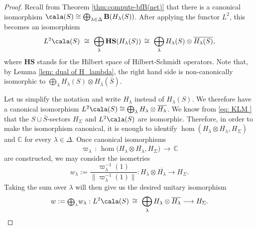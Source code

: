 \documentclass[a4paper,10pt,leqno]{amsart}
\newcommand{\IC}{\mathbb{C}}     \newcommand{\calc}{\mathcal{C}}
\newcommand{\bfB}{{\mathbf B}}   \newcommand{\sfB}{{\mathsf{B}}}
\theoremstyle{plain}
\theoremstyle{definition}
\theoremstyle{remark}
\begin{document}
\begin{proof}
Recall from Theorem \ref{thm:compute-bfB(net)} that there is a canonical isomorphism
$\cala(S) \cong \bigoplus_{\lambda\in\Delta} \bfB(H_\lambda(S))$.
After applying the functor $L^2$, this becomes an isomorphism
\[
L^2\cala(S) \,\,\cong\,\, \bigoplus_{\lambda} \mathbf{HS}(H_\lambda(S))\,\cong\,\,\bigoplus_{\lambda} H_\lambda(S)\otimes \overline{H_\lambda(S)},
\]
where $\mathbf{HS}$ stands for the Hilbert space of Hilbert-Schmidt operators.
Note that, by Lemma \ref{lem: dual of H_lambda}, the right hand side is non-canonically isomorphic to $\bigoplus_{\lambda} H_\lambda(S)\otimes {H_{\bar \lambda}(\bar S)}$.

Let us simplify the notation and write $H_\lambda$ instead of $H_\lambda(S)$.
We therefore have a canonical isomorphism $L^2\cala(S)\cong \bigoplus_{\lambda}H_\lambda\otimes \overline{H_\lambda}$.
We know from \eqref{eq:   KLM  } that the $S\sqcup \bar S$-sectors $H_\Sigma$ and $L^2\cala(S)$ are isomorphic.
Therefore, in order to make the isomorphism canonical, it is enough to identify
$\hom(H_\lambda\otimes \overline{H_\lambda},H_\Sigma)$ and $\IC$ for every $\lambda\in\Delta$.
Once canonical isomorphisms 
\begin{equation}\label{eq: varpi}
\varpi_\lambda\,:\,\hom\big(H_\lambda\otimes \overline{H_\lambda},H_\Sigma\big) \,\rightarrow\, \IC
\end{equation}
are constructed, we may consider the isometries
\[
w_\lambda:={\textstyle\frac{\varpi_\lambda^{-1}(1)}{\|\varpi_\lambda^{-1}(1)\|}}:H_\lambda\otimes \overline{H_\lambda}\to H_\Sigma.
\]
Taking the sum over $\lambda$ will then give us the desired unitary isomorphism
\begin{equation}\label{eq: (+)H_l bar H_l --> H_Sig}
w:={\scriptstyle \bigoplus_\lambda} w_\lambda:L^2\cala(S) \,\cong\,\,\bigoplus_{\lambda} H_\lambda\otimes \overline{H_\lambda} \longrightarrow  H_\Sigma.
\end{equation}


\end{proof}
\end{document}
